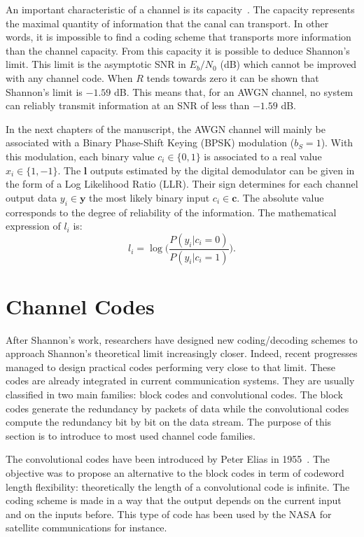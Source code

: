 An important characteristic of a channel is its capacity~\cite{Shannon1948}. The
capacity represents the maximal quantity of information that the canal can
transport. In other words, it is impossible to find a coding scheme that
transports more information than the channel capacity. From this capacity it is
possible to deduce Shannon's limit. This limit is the asymptotic SNR in
$E_b/N_0$ (dB) which cannot be improved with any channel code. When $R$ tends
towards zero it can be shown that Shannon's limit is $-1.59$ dB. This means
that, for an AWGN channel, no system can reliably transmit information at an SNR
of less than $-1.59$ dB.

In the next chapters of the manuscript, the AWGN channel will mainly be
associated with a Binary Phase-Shift Keying (BPSK) modulation ($b_S = 1$). With
this modulation, each binary value $c_i \in \{0,1\}$ is associated to a real
value $x_i \in \{1,-1\}.$ The $\bm{l}$ outputs estimated by the digital
demodulator can be given in the form of a Log Likelihood Ratio (LLR). Their sign
determines for each channel output data $y_i \in \bm{y}$ the most likely binary
input $c_i \in \bm{c}$. The absolute value corresponds to the degree of
reliability of the information. The mathematical expression of $l_i$ is:
\begin{equation*}
l_i = \log{\Big(\frac{P(y_i|c_i = 0)}{P(y_i|c_i = 1)}\Big)}.
\end{equation*}

\section{Channel Codes}

After Shannon's work, researchers have designed new coding/decoding schemes to
approach Shannon's theoretical limit increasingly closer. Indeed, recent
progresses managed to design practical codes performing very close to that
limit. These codes are already integrated in current communication systems. They
are usually classified in two main families: block codes and convolutional
codes. The block codes generate the redundancy by packets of data while the
convolutional codes compute the redundancy bit by bit on the data stream. The
purpose of this section is to introduce to most used channel code families.

The convolutional codes have been introduced by Peter Elias in
1955~\cite{Elias1955}. The objective was to propose an alternative to the block
codes in term of codeword length flexibility: theoretically the length of a
convolutional code is infinite. The coding scheme is made in a way that the
output depends on the current input and on the inputs before. This type of code
has been used by the NASA for satellite communications for instance.

